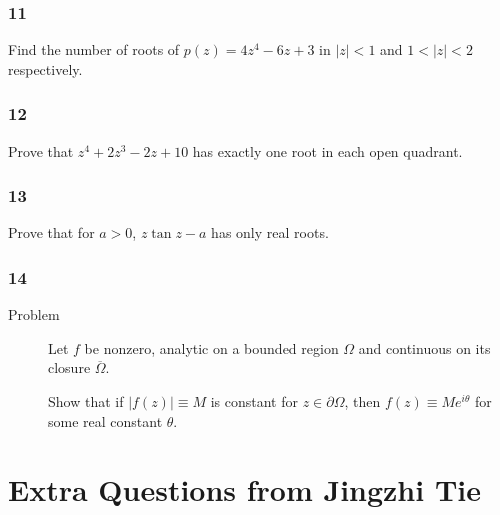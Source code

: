 \hypertarget{section-83}{%
\subsubsection{11}\label{section-83}}

\begin{description}
\tightlist
\item[Problem]
Find the number of roots of \(p(z) = 4z^4 - 6z + 3\) in
\({\left\lvert {z} \right\rvert} < 1\) and
\(1 < {\left\lvert {z} \right\rvert} < 2\) respectively.
\end{description}

\hypertarget{section-84}{%
\subsubsection{12}\label{section-84}}

\begin{description}
\tightlist
\item[Problem]
Prove that \(z^4 + 2z^3 -2z + 10\) has exactly one root in each open
quadrant.
\end{description}

\hypertarget{section-85}{%
\subsubsection{13}\label{section-85}}

\begin{description}
\tightlist
\item[Problem]
Prove that for \(a> 0\), \(z\tan z - a\) has only real roots.
\end{description}

\hypertarget{section-86}{%
\subsubsection{14}\label{section-86}}

\begin{description}
\item[Problem]
Let \(f\) be nonzero, analytic on a bounded region \(\Omega\) and
continuous on its closure \(\overline \Omega\).

Show that if \({\left\lvert {f(z)} \right\rvert} \equiv M\) is constant
for \(z\in \partial \Omega\), then \(f(z) \equiv Me^{i\theta}\) for some
real constant \(\theta\).
\end{description}

\hypertarget{extra-questions-from-jingzhi-tie}{%
\section{Extra Questions from Jingzhi
Tie}\label{extra-questions-from-jingzhi-tie}}

